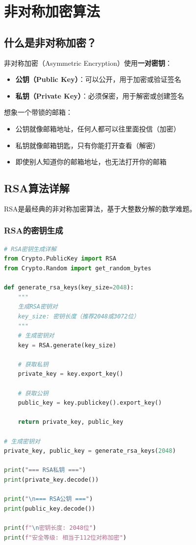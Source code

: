 \documentclass[12pt,a4paper]{article}
\begin{document}
\section{非对称加密算法}

\subsection{什么是非对称加密？}

非对称加密（Asymmetric Encryption）使用\textbf{一对密钥}：
\begin{itemize}[leftmargin=1.5em]
\item \textbf{公钥（Public Key）}：可以公开，用于加密或验证签名
\item \textbf{私钥（Private Key）}：必须保密，用于解密或创建签名
\end{itemize}

\begin{examplebox}[生活实例]
想象一个带锁的邮箱：
\begin{itemize}
\item 公钥就像邮箱地址，任何人都可以往里面投信（加密）
\item 私钥就像邮箱钥匙，只有你能打开查看（解密）
\item 即使别人知道你的邮箱地址，也无法打开你的邮箱
\end{itemize}
\end{examplebox}

\subsection{RSA算法详解}

RSA是最经典的非对称加密算法，基于大整数分解的数学难题。

\subsubsection{RSA的密钥生成}

\begin{lstlisting}[language=Python]
# RSA密钥生成详解
from Crypto.PublicKey import RSA
from Crypto.Random import get_random_bytes

def generate_rsa_keys(key_size=2048):
    """
    生成RSA密钥对
    key_size: 密钥长度（推荐2048或3072位）
    """
    # 生成密钥对
    key = RSA.generate(key_size)
    
    # 获取私钥
    private_key = key.export_key()
    
    # 获取公钥
    public_key = key.publickey().export_key()
    
    return private_key, public_key

# 生成密钥对
private_key, public_key = generate_rsa_keys(2048)

print("=== RSA私钥 ===")
print(private_key.decode())

print("\n=== RSA公钥 ===")
print(public_key.decode())

print(f"\n密钥长度: 2048位")
print(f"安全等级: 相当于112位对称加密")
\end{lstlisting}
\end{document}
